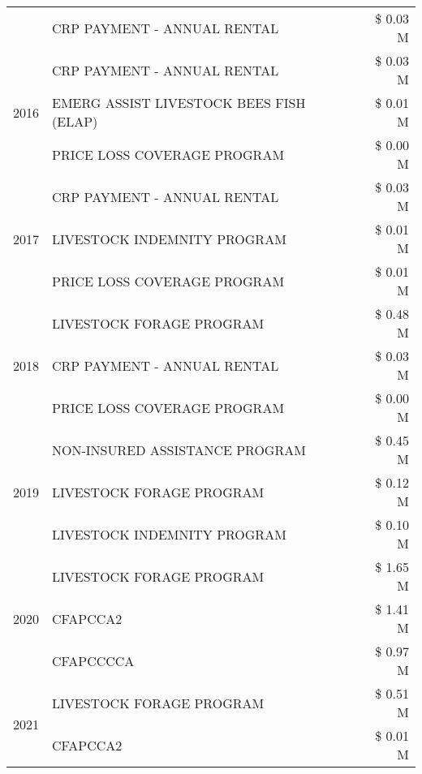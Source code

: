 \begin{tabular}{llr}
 & CRP PAYMENT - ANNUAL RENTAL & \$ 0.03 M \\
\cline{1-3}
\multirow[t]{3}{*}{2016} & CRP PAYMENT - ANNUAL RENTAL & \$ 0.03 M \\
 & EMERG ASSIST LIVESTOCK BEES FISH (ELAP) & \$ 0.01 M \\
 & PRICE LOSS COVERAGE PROGRAM & \$ 0.00 M \\
\cline{1-3}
\multirow[t]{3}{*}{2017} & CRP PAYMENT - ANNUAL RENTAL & \$ 0.03 M \\
 & LIVESTOCK INDEMNITY PROGRAM & \$ 0.01 M \\
 & PRICE LOSS COVERAGE PROGRAM & \$ 0.01 M \\
\cline{1-3}
\multirow[t]{3}{*}{2018} & LIVESTOCK FORAGE PROGRAM & \$ 0.48 M \\
 & CRP PAYMENT - ANNUAL RENTAL & \$ 0.03 M \\
 & PRICE LOSS COVERAGE PROGRAM & \$ 0.00 M \\
\cline{1-3}
\multirow[t]{3}{*}{2019} & NON-INSURED ASSISTANCE PROGRAM & \$ 0.45 M \\
 & LIVESTOCK FORAGE PROGRAM & \$ 0.12 M \\
 & LIVESTOCK INDEMNITY PROGRAM & \$ 0.10 M \\
\cline{1-3}
\multirow[t]{3}{*}{2020} & LIVESTOCK FORAGE PROGRAM & \$ 1.65 M \\
 & CFAPCCA2 & \$ 1.41 M \\
 & CFAPCCCCA & \$ 0.97 M \\
\cline{1-3}
\multirow[t]{2}{*}{2021} & LIVESTOCK FORAGE PROGRAM & \$ 0.51 M \\
 & CFAPCCA2 & \$ 0.01 M \\
\cline{1-3}
\bottomrule
\end{tabular}
